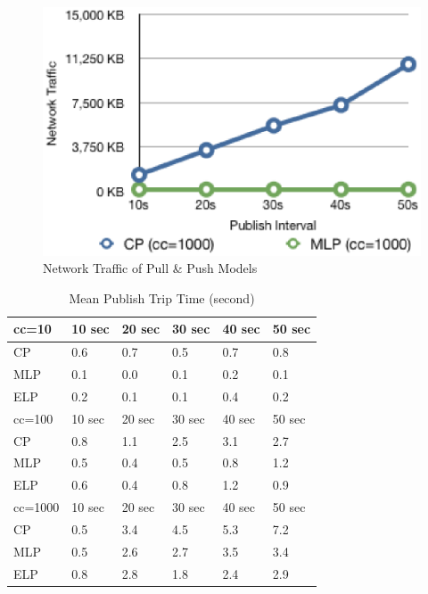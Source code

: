 \begin{figure}[htb!]
\centering%
    \includegraphics[scale=0.60]{figures/io.eps}
    \caption{Network Traffic of Pull \& Push Models}
    \label{fig:traffic}
\end{figure}


\begin{table}
\centering \caption{\label{tb:mpt_all} Mean Publish Trip Time (second)}
\begin{tabular}{|l|l|l|l|l|l|}
    \hline cc=10 & 10 sec & 20 sec & 30 sec & 40 sec & 50 sec \\
    \hline CP & 0.6 & 0.7 & 0.5 & 0.7 & 0.8 \\
    \hline MLP & 0.1 & 0.0 & 0.1 & 0.2 & 0.1 \\
    \hline ELP & 0.2 & 0.1 & 0.1 & 0.4 & 0.2 \\
    \hline
    \hline cc=100 & 10 sec & 20 sec & 30 sec & 40 sec & 50 sec \\
    \hline CP & 0.8 & 1.1 & 2.5 & 3.1 & 2.7 \\
    \hline MLP & 0.5 & 0.4 & 0.5 & 0.8 & 1.2 \\
    \hline ELP & 0.6 & 0.4 & 0.8 & 1.2 & 0.9 \\
    \hline
    \hline cc=1000& 10 sec & 20 sec & 30 sec & 40 sec & 50 sec \\
    \hline CP & 0.5 & 3.4 & 4.5 & 5.3 & 7.2 \\
    \hline MLP & 0.5 & 2.6 & 2.7 & 3.5 & 3.4 \\
    \hline ELP & 0.8 & 2.8 & 1.8 & 2.4 & 2.9 \\
    \hline
\end{tabular}
\end{table}

